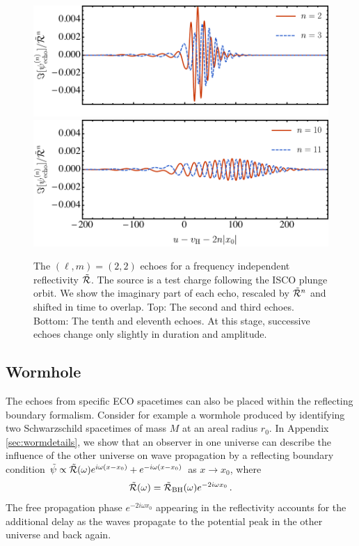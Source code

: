 \begin{refsection}
\begin{figure}[t]
\includegraphics[width = 1 \columnwidth]{chapter_echo/etc/Echo23TD.pdf}\\
\vspace{-11.5pt}
\includegraphics[width = 1 \columnwidth]{chapter_echo/etc/Echo1011TD.pdf}
\caption{
The $(\ell,m)=(2,2)$ echoes for a frequency independent reflectivity $\tilde{\mathcal R}$. The source is a test charge following the ISCO plunge orbit. We show the imaginary part of each echo, rescaled by $\tilde{\mathcal R}^n$ and shifted in time to overlap.
Top: The second and third echoes.
Bottom: The tenth and eleventh echoes. At this stage, successive echoes change only slightly in duration and amplitude.
}
\label{fig:Echotime2}
\end{figure}

\subsection{Wormhole}

The echoes from specific ECO spacetimes can also be placed within the reflecting boundary formalism.
Consider for example a wormhole produced by identifying two Schwarzschild spacetimes of mass $M$ at an areal radius $r_0$.  In Appendix \ref{sec:wormdetails}, we show that an observer in one universe can describe the influence of the other universe on wave propagation by a reflecting boundary condition $\tilde \psi \propto \tilde{\mathcal R}(\omega)e^{i\omega(x-x_0)}+e^{-i\omega (x-x_0)}$ as $x\to x_0$, where
\begin{align}
\tilde{\mathcal R}(\omega)=\tilde{\mathcal R}_{\rm BH}(\omega)e^{-2i\omega x_0} \,.
\label{eq:wormbc}
\end{align}
The free propagation phase $e^{-2i\omega x_0}$ appearing in the reflectivity accounts for the additional delay as the waves propagate to the potential peak in the other universe and back again.


\end{refsection}

